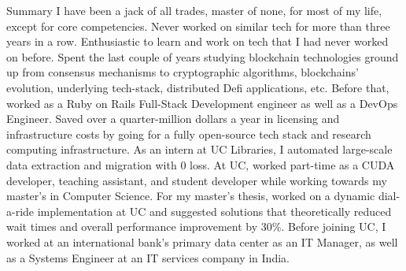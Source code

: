 \documentclass[]{mcdowellcv}
\begin{document}
\makeheader
      
\begin{cvsection}{Summary}
\hfill \break
I have been a jack of all trades, master of none, for most of my life, except for core competencies. Never worked on similar tech for more than three years in a row. Enthusiastic to learn and work on tech that I had never worked on before.\hfill \break \linebreak
Spent the last couple of years studying blockchain technologies ground up from consensus mechanisms to cryptographic algorithms, blockchains' evolution, underlying tech-stack, distributed Defi applications, etc. Before that, worked as a Ruby on Rails Full-Stack Development engineer as well as a DevOps Engineer. Saved over a quarter-million dollars a year in licensing and infrastructure costs by going for a fully open-source tech stack and research computing infrastructure.\hfill \break \linebreak
As an intern at UC Libraries, I automated large-scale data extraction and migration with 0 loss. At UC, worked part-time as a CUDA developer, teaching assistant, and student developer while working towards my master's in Computer Science.\hfill \break \linebreak
For my master's thesis, worked on a dynamic dial-a-ride implementation at UC and suggested solutions that theoretically reduced wait times and overall performance improvement by 30\%. Before joining UC, I worked at an international bank's primary data center as an IT Manager, as well as a Systems Engineer at an IT services company in India.
\end{cvsection}
\end{document}
